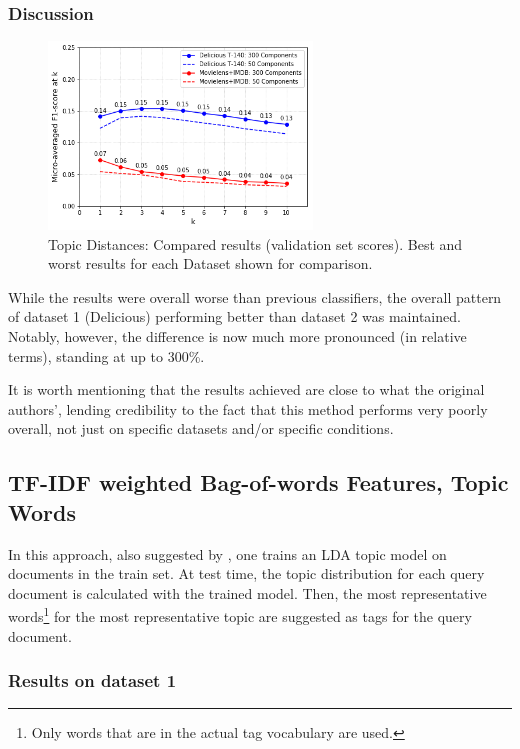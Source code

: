 \subsubsection{Discussion}

\begin{figure}[H]
    \centering
    \includegraphics[width=7cm]{chapters/05_experiments/images/proposal-1-compared-topic-distances.png}
    \caption{Topic Distances: Compared results (validation set scores). Best and worst results for each Dataset shown for comparison.}
    \label{fig:compared_topic_distances}
\end{figure}

While the results were overall worse than previous classifiers, the overall pattern of dataset 1 (Delicious) performing better than dataset 2 was maintained. Notably, however, the difference is now much more pronounced (in relative terms), standing at up to 300\%.

It is worth mentioning that the results achieved are close to what the original authors', lending credibility to the fact that this method performs very poorly overall, not just on specific datasets and/or specific conditions.

\subsection{TF-IDF weighted Bag-of-words Features, Topic Words}

In this approach, also suggested by \cite{choubey_2011}, one trains an LDA topic model on documents in the train set. At test time, the topic distribution for each query document is calculated with the trained model. Then, the most representative words\footnote{Only words that are in the actual tag vocabulary are used.} for the most representative topic are suggested as tags for the query document.

\subsubsection{Results on dataset 1}

